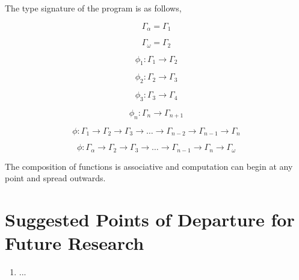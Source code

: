 The type signature of the program is as follows,

\begin{equation}
    \Gamma_\alpha = \Gamma_1
\end{equation}

\begin{equation}
    \Gamma_\omega = \Gamma_2
\end{equation}

\begin{equation}
    \phi_1: \Gamma_1 \rightarrow \Gamma_2
\end{equation}

\begin{equation}
    \phi_2: \Gamma_2 \rightarrow \Gamma_3
\end{equation}

\begin{equation}
    \phi_3: \Gamma_3 \rightarrow \Gamma_4
\end{equation}

\begin{equation}
    \phi_n: \Gamma_n \rightarrow \Gamma_{n+1}
\end{equation}

\begin{equation}
    \phi: \Gamma_1 \rightarrow \Gamma_2 \rightarrow \Gamma_3 \rightarrow \dots \rightarrow \Gamma_{n-2} \rightarrow \Gamma_{n-1} \rightarrow \Gamma_n
\end{equation}

\begin{equation}
    \phi: \Gamma_\alpha \rightarrow \Gamma_2 \rightarrow \Gamma_3 \rightarrow \dots \rightarrow \Gamma_{n-1} \rightarrow \Gamma_n \rightarrow \Gamma_\omega
\end{equation}

The composition of functions is associative and computation can begin at any
point and spread outwards.

\section{Suggested Points of Departure for Future Research}
\begin{enumerate}
    \item ...
\end{enumerate}